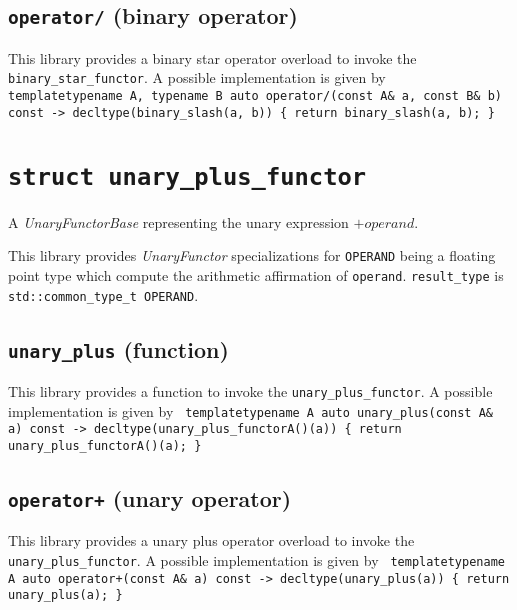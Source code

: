\documentclass[oneside]{book}
\begin{document}
\subsection{\texttt{operator/} (binary operator)}
This library provides a binary star operator overload to invoke the \texttt{binary\_star\_functor}.
A possible implementation is given by\newline
\texttt{
template\textlangle typename A, typename B\textrangle\newline
auto operator/(const A\& a, const B\& b) const -> decltype(binary\_slash(a, b))\newline
\{ return binary\_slash(a, b); \}
}

\section{\texttt{struct unary\_plus\_functor}}
A \textit{UnaryFunctorBase} representing the unary expression $+\textit{operand}$.\newline

\noindent{}This library provides \textit{UnaryFunctor}            specializations for
\texttt{OPERAND} being a floating point type which compute the arithmetic affirmation
of \texttt{operand}. \texttt{result\_type} is \texttt{std::common\_type\_t\textlangle
OPERAND\textrangle}.

\subsection{\texttt{unary\_plus} (function)}
This library provides a function to invoke the \texttt{unary\_plus\_functor}.
A possible implementation is given by\newline
\texttt{
template\textlangle typename A\textrangle\newline
auto unary\_plus(const A\& a) const -> decltype(unary\_plus\_functor\textlangle A\textrangle()(a))\newline
\{ return unary\_plus\_functor\textlangle A\textrangle()(a); \}
}

\subsection{\texttt{operator+} (unary operator)}
This library provides a unary plus operator overload to invoke the \texttt{unary\_plus\_functor}.
A possible implementation is given by\newline
\texttt{
template\textlangle typename A\textrangle\newline
auto operator+(const A\& a) const -> decltype(unary\_plus(a))\newline
\{ return unary\_plus(a); \}
}
\end{document}
